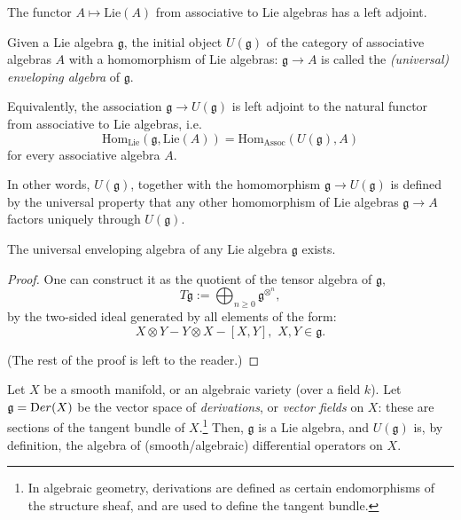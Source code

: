 The functor $A\mapsto \text{Lie}(A)$ from associative to Lie algebras has a left adjoint.

\begin{definition}
 \label{definition-universal-enveloping-algebra}
Given a Lie algebra $\mathfrak g$, the initial object $U(\mathfrak g)$ of the category of associative algebras $A$ with a homomorphism of Lie algebras: $\mathfrak g\to A$ is called the {\it (universal) enveloping algebra} of $\mathfrak g$. 

Equivalently, the association $\mathfrak g\to U(\mathfrak g)$ is left adjoint to the natural functor from associative to Lie algebras, i.e. 
$$\text{Hom}_{\text{Lie}} (\mathfrak g, \text{Lie}(A)) = \text{Hom}_{\text{Assoc}} (U(\mathfrak g), A)$$
for every associative algebra $A$.
\end{definition}

In other words, $U(\mathfrak g)$, together with the homomorphism $\mathfrak g\to U(\mathfrak g)$ is defined by the universal property that any other homomorphism of Lie algebras $\mathfrak g\to A$ factors uniquely through $U(\mathfrak g)$. 

\begin{proposition}
 \label{proposition-enveloping-exists}
The universal enveloping algebra of any Lie algebra $\mathfrak g$ exists. 
\end{proposition}

\begin{proof}
One can construct it as the quotient of the tensor algebra of $\mathfrak g$,
$$T\mathfrak g:= \bigoplus_{n\ge 0} \mathfrak g^{\otimes^n},$$
by the two-sided ideal generated by all elements of the form: 
$$X\otimes Y - Y\otimes X - [X,Y],\, \, X,Y\in \mathfrak g.$$ 

(The rest of the proof is left to the reader.)

\end{proof}

\begin{example}
 \label{example-derivations}
Let $X$ be a smooth manifold, or an algebraic variety (over a field $k$). Let $\mathfrak g = {\text Der}(X)$ be the vector space of \emph{derivations}, or \emph{vector fields} on $X$: these are sections of the tangent bundle of $X$.\footnote{In algebraic geometry, derivations are defined as certain endomorphisms of the structure sheaf, and are used to define the tangent bundle.} Then, $\mathfrak g$ is a Lie algebra, and $U(\mathfrak g)$ is, by definition, the algebra of (smooth/algebraic) differential operators on $X$.
\end{example}


